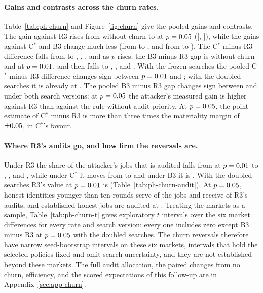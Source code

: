\documentclass[11pt]{article}
\begin{document}
\paragraph{Gains and contrasts across the churn rates.} Table~\ref{tab:ph-churn} and Figure~\ref{fig:churn} give the pooled gains and contrasts. The gain against R3 rises from  without churn to  at $p = 0.05$ ([, ]), while the gains against C$^*$ and B3 change much less (from  to , and from  to ). The C$^*$ minus R3 difference falls from  to , , , and  as $p$ rises; the B3 minus R3 gap is  without churn and  at $p = 0.01$, and then falls to , , and . With the frozen searches the pooled C$^*$ minus R3 difference changes sign between $p = 0.01$ and ; with the doubled searches it is already  at . The pooled B3 minus R3 gap changes sign between  and  under both search versions: at $p = 0.05$ the attacker's measured gain is higher against R3 than against the rule without audit priority. At $p = 0.05$, the point estimate of C$^*$ minus R3 is more than three times the materiality margin of $\pm0.05$, in C$^*$'s favour.

\paragraph{Where R3's audits go, and how firm the reversals are.} Under R3 the share of the attacker's jobs that is audited falls from  at $p = 0.01$ to , , and , while under C$^*$ it moves from  to  and under B3 it is . With the doubled searches R3's value at $p = 0.01$ is  (Table~\ref{tab:ph-churn-audit}). At $p = 0.05$, honest identities younger than ten rounds serve  of the jobs and receive  of R3's audits, and established honest jobs are audited at . Treating the markets as a sample, Table~\ref{tab:ph-churn-t} gives exploratory $t$ intervals over the six market differences for every rate and search version: every one includes zero except B3 minus R3 at $p = 0.05$ with the doubled searches. The churn reversals therefore have narrow seed-bootstrap intervals on these six markets, intervals that hold the selected policies fixed and omit search uncertainty, and they are not established beyond these markets. The full audit allocation, the paired changes from no churn, efficiency, and the scored expectations of this follow-up are in Appendix~\ref{sec:app-churn}.
\end{document}
